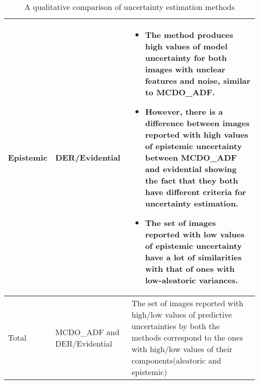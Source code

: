 \begin{table}[H]
\begin{tabular}[h]{|p{1.5cm}|p{2.3cm}|p{12.5cm}|}
\hline
Epistemic&DER/Evidential&\begin{itemize}\item The method produces high values of model uncertainty for both images with unclear features and noise, similar to MCDO\_ADF.\item However, there is a difference between images reported with high values of epistemic uncertainty between MCDO\_ADF and evidential showing the fact that they both have different criteria for uncertainty estimation.\item The set of images reported with low values of epistemic uncertainty have a lot of similarities with that of ones with low-aleatoric variances.\end{itemize}\\
\hline
Total& MCDO\_ADF and DER/Evidential& The set of images reported with high/low values of predictive uncertainties by both the methods correspond to the ones with high/low values of their components(aleatoric and epistemic)\\
\hline
\end{tabular}
\caption{A qualitative comparison of uncertainty estimation methods}
\label{tab_qualit_compare}
\end{table}



